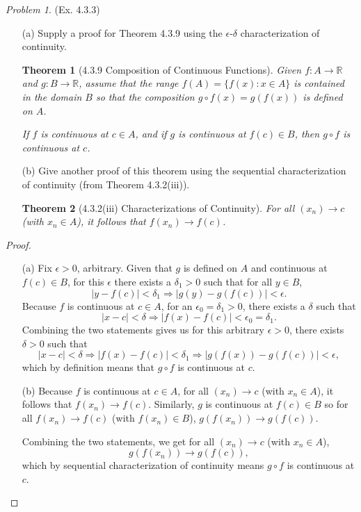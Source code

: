 \documentclass[11pt,twoside, reqno]{amsart}
\newtheorem{Thm}{Theorem}
\theoremstyle{remark}
\newtheorem{Prob}{Problem}
\def\R{\mathbb R}
\renewcommand{\implies}{\Rightarrow}
\begin{document}
\begin{Prob}(Ex. 4.3.3)
\begin{enumerate}
    \item [(a)] Supply a proof for Theorem 4.3.9 using the $\epsilon$-$\delta$ characterization of continuity.
    
    \begin{Thm}[4.3.9 Composition of Continuous Functions]
        Given $f : A \to \R$ and $g : B \to \R$, assume that the range $f(A) = \{f(x) : x \in A\}$ is contained in the domain $B$ so that the composition $g \circ f(x) = g(f(x))$ is defined on $A$.
        
        If $f$ is continuous at $c \in A$, and if $g$ is continuous at $f(c) \in B$, then $g \circ f$ is continuous at $c$.
    \end{Thm}
    \item [(b)] Give another proof of this theorem using the sequential characterization of continuity (from Theorem 4.3.2(iii)).
    
    \begin{Thm}[4.3.2(iii) Characterizations of Continuity]
        For all $(x_n) \to c$ (with $x_n \in A$), it follows that $f(x_n) \to f(c)$.
    \end{Thm}
\end{enumerate}
\end{Prob}

\begin{proof}
\begin{enumerate}
    \item [(a)] Fix $\epsilon > 0$, arbitrary. Given that $g$ is defined on $A$ and continuous at $f(c) \in B$, for this $\epsilon$ there exists a $\delta_1 > 0$ such that for all $y \in B$, 
    $$
    |y - f(c)| < \delta_1 \implies |g(y) - g(f(c))| < \epsilon.
    $$
    Because $f$ is continuous at $c \in A$, for an $\epsilon_0 = \delta_1 > 0$, there exists a $\delta$ such that
    $$
    |x - c| < \delta \implies |f(x) - f(c)| < \epsilon_0 = \delta_1.
    $$
    Combining the two statements gives us for this arbitrary $\epsilon > 0$, there exists $\delta > 0$ such that
    $$
    |x - c| < \delta \implies |f(x) - f(c)| < \delta_1 \implies |g(f(x)) - g(f(c))| < \epsilon,
    $$
    which by definition means that $g \circ f$ is continuous at $c$.
    \item [(b)] Because $f$ is continuous at $c \in A$, for all $(x_n) \to c$ (with $x_n \in A$), it follows that $f(x_n) \to f(c)$. Similarly, $g$ is continuous at $f(c) \in B$ so for all $f(x_n) \to f(c)$ (with $f(x_n) \in B$), $g(f(x_n)) \to g(f(c))$. 
    
    Combining the two statements, we get for all $(x_n) \to c$ (with $x_n \in A$),
    $$
        g(f(x_n)) \to g(f(c)),
    $$
    which by sequential characterization of continuity means $g \circ f$ is continuous at $c$.
\end{enumerate}

\end{proof}
\end{document}
